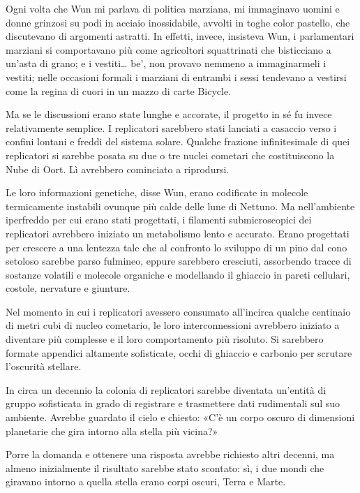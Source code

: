 Ogni volta che Wun mi parlava di politica marziana, mi immaginavo uomini
e donne grinzosi su podi in acciaio inossidabile, avvolti in toghe color
pastello, che discutevano di argomenti astratti. In effetti, invece,
insisteva Wun, i parlamentari marziani si comportavano più come
agricoltori squattrinati che bisticciano a un'asta di grano; e i
vestiti\ldots{} be', non provavo nemmeno a immaginarmeli i vestiti;
nelle occasioni formali i marziani di entrambi i sessi tendevano a
vestirsi come la regina di cuori in un mazzo di carte Bicycle.

Ma se le discussioni erano state lunghe e accorate, il progetto in sé fu
invece relativamente semplice. I replicatori sarebbero stati lanciati a
casaccio verso i confini lontani e freddi del sistema solare. Qualche
frazione infinitesimale di quei replicatori si sarebbe posata su due o
tre nuclei cometari che costituiscono la Nube di Oort. Lì avrebbero
cominciato a riprodursi.

Le loro informazioni genetiche, disse Wun, erano codificate in molecole
termicamente instabili ovunque più calde delle lune di Nettuno. Ma
nell'ambiente iperfreddo per cui erano stati progettati, i filamenti
submicroscopici dei replicatori avrebbero iniziato un metabolismo lento
e accurato. Erano progettati per crescere a una lentezza tale che al
confronto lo sviluppo di un pino dal cono setoloso sarebbe parso
fulmineo, eppure sarebbero cresciuti, assorbendo tracce di sostanze
volatili e molecole organiche e modellando il ghiaccio in pareti
cellulari, costole, nervature e giunture.

Nel momento in cui i replicatori avessero consumato all'incirca qualche
centinaio di metri cubi di nucleo cometario, le loro interconnessioni
avrebbero iniziato a diventare più complesse e il loro comportamento più
risoluto. Si sarebbero formate appendici altamente sofisticate, occhi di
ghiaccio e carbonio per scrutare l'oscurità stellare.

In circa un decennio la colonia di replicatori sarebbe diventata
un'entità di gruppo sofisticata in grado di registrare e trasmettere
dati rudimentali sul suo ambiente. Avrebbe guardato il cielo e chiesto:
«C'è un corpo oscuro di dimensioni planetarie che gira intorno alla
stella più vicina?»

Porre la domanda e ottenere una risposta avrebbe richiesto altri
decenni, ma almeno inizialmente il risultato sarebbe stato scontato: sì,
i due mondi che giravano intorno a quella stella erano corpi oscuri,
Terra e Marte.

